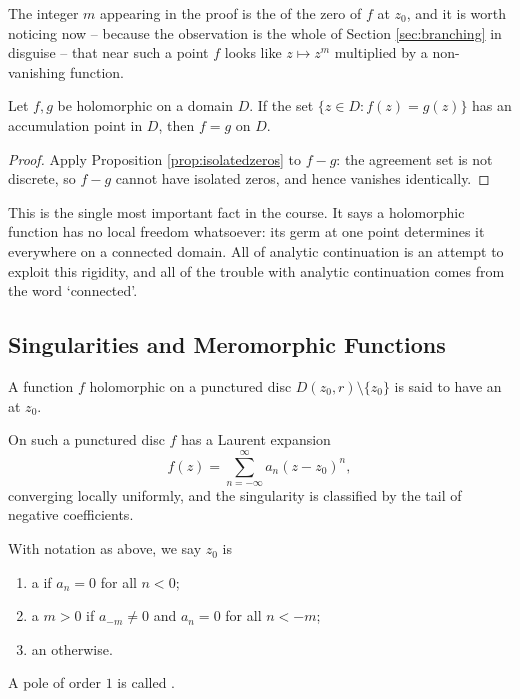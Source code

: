 The integer $m$ appearing in the proof is the  of the zero of $f$ at $z_0$,
and it is worth noticing now -- because the observation is the whole of Section
\ref{sec:branching} in disguise -- that near such a point $f$ looks like $z \mapsto z^m$
multiplied by a non-vanishing function.

\begin{corollary}\label{cor:identity}
	Let $f, g$ be holomorphic on a domain $D$. If the set $\{z \in D : f(z) = g(z)\}$ has
	an accumulation point in $D$, then $f = g$ on $D$.
\end{corollary}

\begin{proof}
	Apply Proposition \ref{prop:isolatedzeros} to $f - g$: the agreement set is not
	discrete, so $f - g$ cannot have isolated zeros, and hence vanishes identically.
\end{proof}

This is the single most important fact in the course. It says a holomorphic function has
no local freedom whatsoever: its germ at one point determines it everywhere on a
connected domain. All of analytic continuation is an attempt to exploit this rigidity,
and all of the trouble with analytic continuation comes from the word `connected'.

\subsection{Singularities and Meromorphic Functions}

\begin{definition}
	A function $f$ holomorphic on a punctured disc $D(z_0, r) \setminus \{z_0\}$ is said
	to have an  at $z_0$.
\end{definition}

On such a punctured disc $f$ has a Laurent expansion
$$
f(z) = \sum_{n = -\infty}^{\infty} a_n (z - z_0)^n,
$$
converging locally uniformly, and the singularity is classified by the tail of negative
coefficients.

\begin{definition}
	With notation as above, we say $z_0$ is
	\begin{enumerate}[label=(\roman*)]
		\item a  if $a_n = 0$ for all $n < 0$;
		\item a  $m > 0$ if $a_{-m} \neq 0$ and $a_n = 0$ for all $n < -m$;
		\item an  otherwise.
	\end{enumerate}
	A pole of order $1$ is called .
\end{definition}

